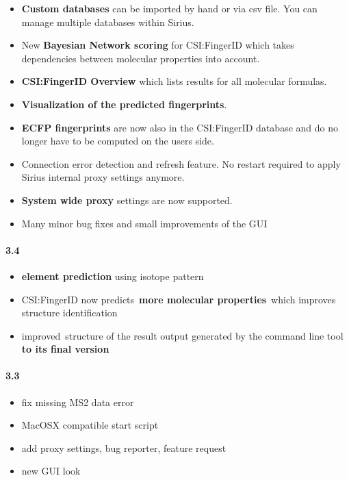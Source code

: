\begin{itemize}

\item
  \textbf{Custom databases} can be imported by hand or via csv file. You
  can manage multiple databases within Sirius.
\item
  New \textbf{Bayesian Network scoring} for CSI:FingerID which takes
  dependencies between molecular properties into account.
\item
  \textbf{CSI:FingerID Overview} which lists results for all molecular
  formulas.
\item
  \textbf{Visualization of the predicted fingerprints}.
\item
  \textbf{ECFP fingerprints} are now also in the CSI:FingerID database
  and do no longer have to be computed on the users side.
\item
  Connection error detection and refresh feature. No restart required to apply Sirius internal proxy settings anymore.
\item
  \textbf{System wide proxy} settings are now supported.
\item
  Many minor bug fixes and small improvements of the GUI
\end{itemize}

\paragraph{3.4}

\begin{itemize}

\item
  \textbf{element prediction} using isotope pattern
\item
  CSI:FingerID now predicts~\textbf{more molecular properties}~which
  improves structure identification
\item
  improved~structure of the result output generated by the command line
  tool \textbf{to its final version}
\end{itemize}

\paragraph{3.3}

\begin{itemize}

\item
  fix missing MS2 data error
\item
  MacOSX compatible start script
\item
  add proxy settings, bug reporter, feature request
\item
  new GUI look
\end{itemize}

